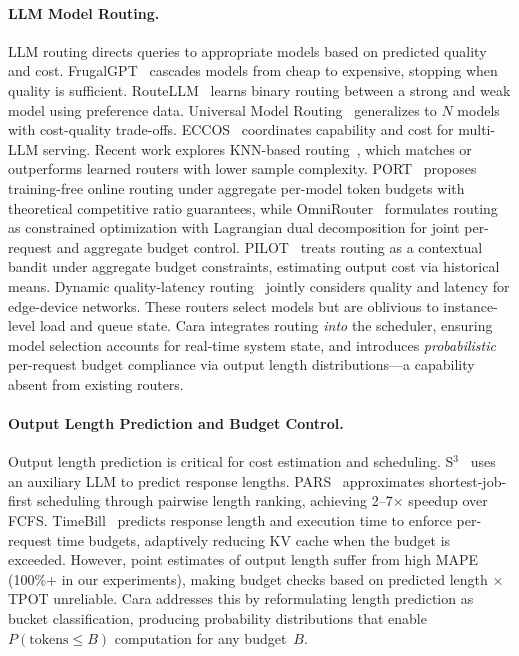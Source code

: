 \documentclass[letterpaper, anonymous, twocolumn, 10pt]{article}
\begin{document}
\paragraph{LLM Model Routing.}
LLM routing directs queries to appropriate models based on predicted quality and cost.
FrugalGPT~\cite{chen2023frugalgpthowuse} cascades models from cheap to expensive, stopping when quality is sufficient.
RouteLLM~\cite{Ong2024RouteLLMLT} learns binary routing between a strong and weak model using preference data.
Universal Model Routing~\cite{universal_model_routering} generalizes to $N$ models with cost-quality trade-offs.
ECCOS~\cite{mei2025eccosefficientcapability} coordinates capability and cost for multi-LLM serving.
Recent work explores KNN-based routing~\cite{knnrouting2025}, which matches or outperforms learned routers with lower sample complexity.
PORT~\cite{port2025} proposes training-free online routing under aggregate per-model token budgets with theoretical competitive ratio guarantees, while OmniRouter~\cite{omnirouter2025} formulates routing as constrained optimization with Lagrangian dual decomposition for joint per-request and aggregate budget control.
PILOT~\cite{pilot2025} treats routing as a contextual bandit under aggregate budget constraints, estimating output cost via historical means.
Dynamic quality-latency routing~\cite{dynamicqlatency2025} jointly considers quality and latency for edge-device networks.
These routers select models but are oblivious to instance-level load and queue state.
Cara integrates routing \emph{into} the scheduler, ensuring model selection accounts for real-time system state, and introduces \emph{probabilistic} per-request budget compliance via output length distributions---a capability absent from existing routers.

\paragraph{Output Length Prediction and Budget Control.}
Output length prediction is critical for cost estimation and scheduling.
S$^3$~\cite{xue2023responselengthperception} uses an auxiliary LLM to predict response lengths.
PARS~\cite{pars2025} approximates shortest-job-first scheduling through pairwise length ranking, achieving 2--7$\times$ speedup over FCFS.
TimeBill~\cite{timebill2025} predicts response length and execution time to enforce per-request time budgets, adaptively reducing KV cache when the budget is exceeded.
However, point estimates of output length suffer from high MAPE (100\%+ in our experiments), making budget checks based on predicted length $\times$ TPOT unreliable.
Cara addresses this by reformulating length prediction as bucket classification, producing probability distributions that enable $P(\text{tokens} \leq B)$ computation for any budget~$B$.
\end{document}

